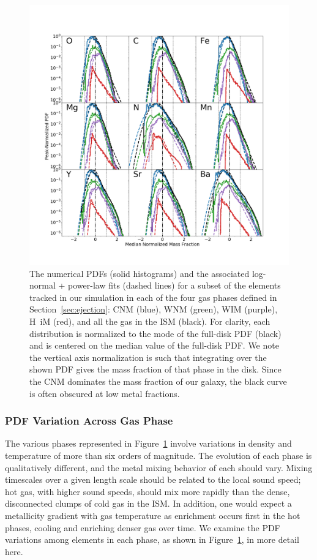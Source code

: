 \documentclass[twocolumn]{aastex61}
\begin{document}
\begin{figure}
\centering
\includegraphics[width=0.95\linewidth]{DD0390_element_by_element.png}
\caption{The numerical PDFs (solid histograms) and the associated log-normal + power-law fits (dashed lines) for a subset of the elements tracked in our simulation in each of the four gas phases defined in Section~\ref{sec:ejection}: CNM (blue), WNM (green), WIM (purple), H~{\sc i}M (red), and all the gas in the ISM (black). For clarity, each distribution is normalized to the mode of the full-disk PDF (black) and is centered on the median value of the full-disk PDF. We note the vertical axis normalization is such that integrating over the shown PDF gives the mass fraction of that phase in the disk. Since the CNM dominates the mass fraction of our galaxy, the black curve is often obscured at low metal fractions.}
\label{fig:log-normal}
\end{figure}

\subsubsection{PDF Variation Across Gas Phase}
\label{sec:phase-pdfs}

The various phases represented in Figure~\ref{fig:log-normal} involve variations in density and temperature of more than six orders of magnitude. The evolution of each phase is qualitatively different, and the metal mixing behavior of each should vary. Mixing timescales over a given length scale should be related to the local sound speed; hot gas, with higher sound speeds, should mix more rapidly than the dense, disconnected clumps of cold gas in the ISM. In addition, one would expect a metallicity gradient with gas temperature as enrichment occurs first in the hot phases, cooling and enriching denser gas over time. We examine the PDF variations among elements in each phase, as shown in Figure~\ref{fig:log-normal}, in more detail here.
\end{document}
